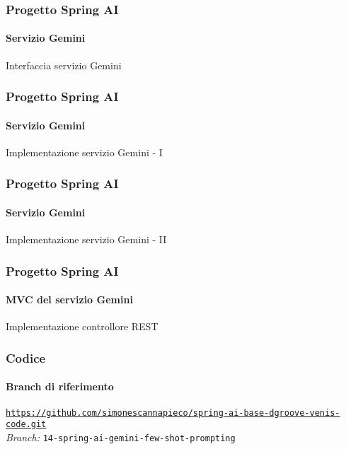 %
\begin{frame}[t,fragile] \frametitle{Progetto Spring AI}
    \framesubtitle{Servizio Gemini}
        \begin{block}{Interfaccia servizio Gemini}
{\tiny}
    \end{block}
\end{frame}
%
\begin{frame}[t,fragile] \frametitle{Progetto Spring AI}
    \framesubtitle{Servizio Gemini}
		\vspace*{-.7cm}
        \begin{block}{Implementazione servizio Gemini - I}
            {\tiny}
    \end{block}
\end{frame}
%
\begin{frame}[t,fragile] \frametitle{Progetto Spring AI}
    \framesubtitle{Servizio Gemini}
        \begin{block}{Implementazione servizio Gemini - II}
            {\tiny}
    \end{block}
\end{frame}
%
\begin{frame}[t,fragile] \frametitle{Progetto Spring AI}
    \framesubtitle{MVC del servizio Gemini}
    	\vspace*{-.7cm}
        \begin{block}{Implementazione controllore REST}
			{\tiny}
    	\end{block}
\end{frame}
%
\begin{frame}[fragile] \frametitle{Codice}
    \framesubtitle{Branch di riferimento}
	\begin{center}
		{\scriptsize \href{https://github.com/simonescannapieco/spring-ai-base-dgroove-venis-code.git}{\texttt{https://github.com/simonescannapieco/spring-ai-base-dgroove-venis-code.git}}}\\
		\textit{Branch:} \alert{\texttt{14-spring-ai-gemini-few-shot-prompting}}
	\end{center}
\end{frame}